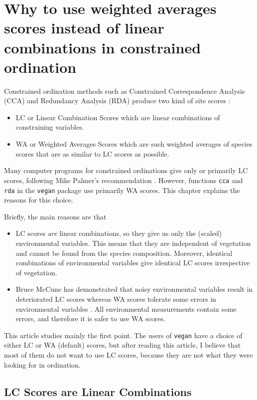 \documentclass[a4paper,10pt]{amsart}
\begin{document}
\section{Why to use weighted averages scores instead of linear
  combinations in constrained ordination}

Constrained ordination methods such as Constrained Correspondence
Analysis (CCA) and Redundancy Analysis (RDA) produce two kind of site
scores \cite{Braak86, Palmer93}:
\begin{itemize}
\item
LC or Linear Combination Scores which are linear combinations of
constraining variables.
\item
WA or Weighted Averages Scores which are such weighted averages of
species scores that are as similar to LC scores as possible.
\end{itemize}
Many computer programs for constrained ordinations give only or
primarily LC scores, following Mike Palmer's recommendation
\cite{Palmer93}.  However, functions \texttt{cca} and \texttt{rda} in
the \texttt{vegan} package use primarily WA scores. This chapter
explains the reasons for this choice.

Briefly, the main reasons are that
\begin{itemize}
\item
LC scores \emph{are} linear combinations, so they give us only the
(scaled) environmental variables. This means that they are
independent of vegetation and cannot be found from the species
composition.  Moreover, identical combinations of environmental
variables give identical LC scores irrespective of vegetation.
\item
Bruce McCune has demonstrated that noisy environmental variables
result in deteriorated LC scores whereas WA scores tolerate some errors
in environmental variables \cite{McCune97}.  All environmental
measurements contain some errors, and therefore it is safer to use WA
scores.
\end{itemize}
This article studies mainly the first point.  The users of
\texttt{vegan} have a choice of either LC or WA (default) scores, but
after reading this article, I believe that most of them do not want to
use LC scores, because they are not what they were looking for in
ordination.

\subsection{LC Scores are Linear Combinations}
\end{document}
